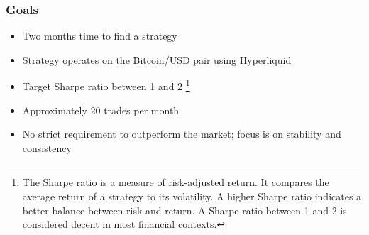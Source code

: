\documentclass[12pt]{article}
\begin{document}
\subsubsection*{Goals}
\begin{itemize}
    \item Two months time to find a strategy
    \item Strategy operates on the Bitcoin/USD pair using \href{https://hyperfoundation.org/}{Hyperliquid}
    \item Target Sharpe ratio between 1 and 2 \footnote{The Sharpe ratio is a measure of risk-adjusted return. It compares the average return of a strategy to its volatility. A higher Sharpe ratio indicates a better balance between risk and return. A Sharpe ratio between 1 and 2 is considered decent in most financial contexts.}
    \item Approximately 20 trades per month
    \item No strict requirement to outperform the market; focus is on stability and consistency
\end{itemize}





\end{document}
